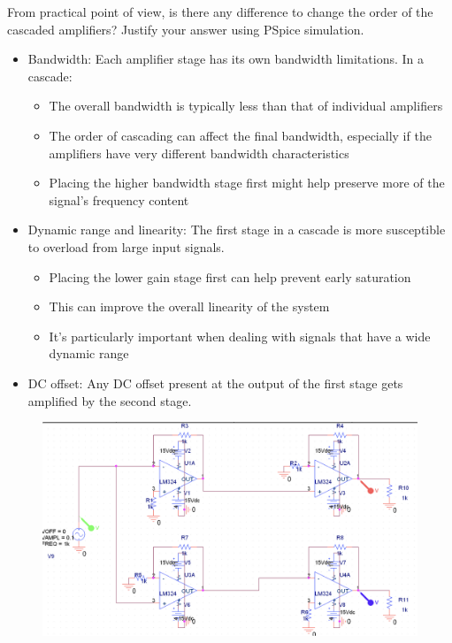 \documentclass[11pt]{article}
\begin{document}
\begin{question}
\begin{subquestion}{From practical point of view, is there any difference to change the order of the cascaded amplifiers? Justify your answer using PSpice simulation.}
{\begin{itemize}
                \item Bandwidth: Each amplifier stage has its own bandwidth limitations. In a cascade:
                      \begin{itemize}
                          \item The overall bandwidth is typically less than that of individual amplifiers
                          \item The order of cascading can affect the final bandwidth, especially if the amplifiers have very different bandwidth characteristics
                          \item Placing the higher bandwidth stage first might help preserve more of the signal's frequency content
                      \end{itemize}
                \item Dynamic range and linearity:
                      The first stage in a cascade is more susceptible to overload from large input signals.
                      \begin{itemize}
                          \item Placing the lower gain stage first can help prevent early saturation
                          \item This can improve the overall linearity of the system
                          \item It's particularly important when dealing with signals that have a wide dynamic range
                      \end{itemize}
                \item DC offset: Any DC offset present at the output of the first stage gets amplified by the second stage.
            \end{itemize}
            \begin{figure}[H]
                \centering
                \includegraphics[scale=0.3,angle=0]{Fig/Q6a.png}

\end{figure}}
\end{subquestion}
\end{question}
\end{document}
